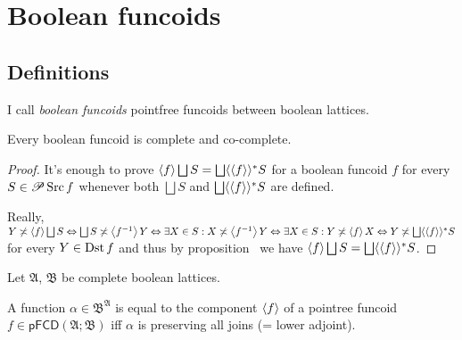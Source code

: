 \chapter{Boolean funcoids}

\section{Definitions}

I call \emph{boolean funcoids} pointfree funcoids between boolean lattices.

\begin{prop}
  Every boolean funcoid is complete and co-complete.
\end{prop}

\begin{proof}
  It's enough to prove $\supfun{f} \bigsqcup S = \bigsqcup \langle
  \supfun{f} \rangle^{\ast} S$ for a boolean funcoid $f$ for every $S
  \in \mathscr{P} \operatorname{Src} f$ whenever both $\bigsqcup S$ and $\bigsqcup
  \langle \supfun{f} \rangle^{\ast} S$ are defined.
  
  Really, $Y \nasymp \supfun{f} \bigsqcup S \Leftrightarrow \bigsqcup S
  \nasymp \supfun{f^{- 1}} Y \Leftrightarrow \exists X \in S : X
  \nasymp \supfun{f^{- 1}} Y \Leftrightarrow \exists X \in S : Y
  \nasymp \supfun{f} X \Leftrightarrow Y \nasymp \bigsqcup \langle
  \supfun{f} \rangle^{\ast} S$ for every $Y \in \operatorname{Dst} f$ and thus
  by proposition~ we have $\supfun{f} \bigsqcup S = \bigsqcup
  \langle \supfun{f} \rangle^{\ast} S$.
\end{proof}

\begin{thm}
  Let $\mathfrak{A}$, $\mathfrak{B}$ be complete boolean lattices.
  
  A function $\alpha \in \mathfrak{B}^{\mathfrak{A}}$ is equal to the
  component $\left\langle f\right\rangle$ of a pointree funcoid $f \in \mathsf{pFCD}
  (\mathfrak{A}; \mathfrak{B})$ iff $\alpha$ is preserving all joins (= lower
  adjoint).
\end{thm}

